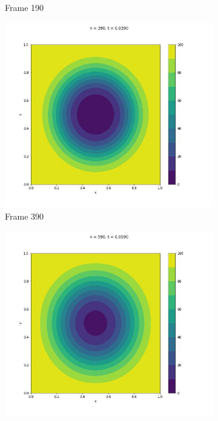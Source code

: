 \documentclass{article}
\begin{document}
\begin{figure} [H]
\begin{subfigure}{0.25\linewidth}
    \caption{Frame 190}
  \end{subfigure}
  \begin{subfigure}{0.25\linewidth}
    \centering
    \includegraphics[width=\linewidth]{Polar/2D/390.jpg}
    \caption{Frame 390}
  \end{subfigure}
    \begin{subfigure}{0.25\linewidth}
    \centering
    \includegraphics[width=\linewidth]{Polar/2D/590.jpg}

\end{subfigure}
\end{figure}
\end{document}
